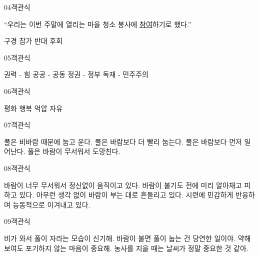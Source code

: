 \documentclass[fs95,seriesFre]{korfarm-base}
\begin{document}
\begin{kfQBlock}{04}{객관식}
\begin{kfEvidence}“우리는 이번 주말에 열리는 마을 청소 봉사에 \uline{참여}하기로 했다.”\end{kfEvidence}
\begin{kfChoices}
\kfChoice 구경
\kfChoice 참가
\kfChoice 반대
\kfChoice 후회
\end{kfChoices}
\end{kfQBlock}

\begin{kfQBlock}{05}{객관식}
\begin{kfChoices}
\kfChoice 권력 - 힘
\kfChoice 공공 - 공동
\kfChoice 정권 - 정부
\kfChoice 독재 - 민주주의
\end{kfChoices}
\end{kfQBlock}

\begin{kfQBlock}{06}{객관식}
\begin{kfChoices}
\kfChoice 평화
\kfChoice 행복
\kfChoice 억압
\kfChoice 자유
\end{kfChoices}
\end{kfQBlock}

\begin{kfQBlock}{07}{객관식}
\begin{kfChoices}
\kfChoice 풀은 비바람 때문에 눕고 운다.
\kfChoice 풀은 바람보다 더 빨리 눕는다.
\kfChoice 풀은 바람보다 먼저 일어난다.
\kfChoice 풀은 바람이 무서워서 도망친다.
\end{kfChoices}
\end{kfQBlock}

\begin{kfQBlock}{08}{객관식}
\begin{kfChoices}
\kfChoice 바람이 너무 무서워서 정신없이 움직이고 있다.
\kfChoice 바람이 불기도 전에 미리 알아채고 피하고 있다.
\kfChoice 아무런 생각 없이 바람이 부는 대로 흔들리고 있다.
\kfChoice 시련에 민감하게 반응하며 능동적으로 이겨내고 있다.
\end{kfChoices}
\end{kfQBlock}

\begin{kfQBlock}{09}{객관식}
\begin{kfChoices}
\kfChoice 비가 와서 풀이 자라는 모습이 신기해.
\kfChoice 바람이 불면 풀이 눕는 건 당연한 일이야.
\kfChoice 약해 보여도 포기하지 않는 마음이 중요해.
\kfChoice 농사를 지을 때는 날씨가 정말 중요한 것 같아.
\end{kfChoices}
\end{kfQBlock}
\end{document}
